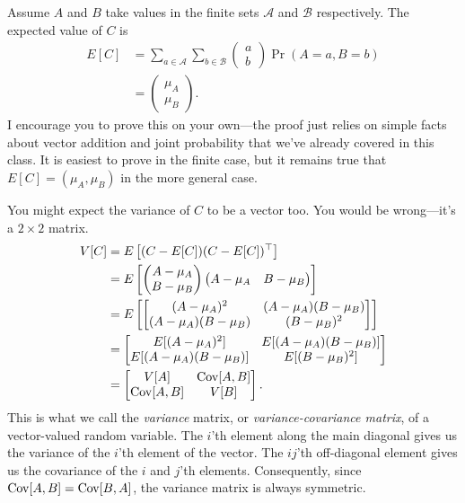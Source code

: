 \documentclass[12pt,oneside,openany]{book}
\begin{document}
Assume \(A\) and \(B\) take values in the finite sets \(\mathcal{A}\)
and \(\mathcal{B}\) respectively. The expected value of \(C\) is \[
\begin{aligned}
E[C]
&= \sum_{a \in \mathcal{A}} \sum_{b \in \mathcal{B}} \begin{pmatrix} a \\ b \end{pmatrix} \Pr(A = a, B = b) \\
&= \begin{pmatrix} \mu_A \\ \mu_B \end{pmatrix}.
\end{aligned}
\] I encourage you to prove this on your own---the proof just relies on
simple facts about vector addition and joint probability that we've
already covered in this class. It is easiest to prove in the finite
case, but it remains true that \(E[C] = (\mu_A, \mu_B)\) in the more
general case.

You might expect the variance of \(C\) to be a vector too. You would be
wrong---it's a \(2 \times 2\) matrix. \[
\begin{aligned}
V[C]
&= E\left[(C - E[C]) (C - E[C])^\top \right] \\
&= E \left[
  \begin{pmatrix} A - \mu_A \\ B - \mu_B \end{pmatrix}
  \begin{pmatrix} A - \mu_A & B - \mu_B \end{pmatrix}
\right] \\
&= E \left[
  \begin{bmatrix}
  (A - \mu_A)^2 & (A - \mu_A) (B - \mu_B) \\
  (A - \mu_A) (B - \mu_B) & (B - \mu_B)^2
  \end{bmatrix}
\right] \\
&= \begin{bmatrix}
  E[(A - \mu_A)^2] & E[(A - \mu_A) (B - \mu_B)] \\
  E[(A - \mu_A) (B - \mu_B)] & E[(B - \mu_B)^2]
\end{bmatrix} \\
&= \begin{bmatrix}
  V[A] & \mathop{\rm Cov}\nolimits[A, B] \\
  \mathop{\rm Cov}\nolimits[A, B] & V[B]
\end{bmatrix}.
\end{aligned}
\] This is what we call the \emph{variance} matrix, or
\emph{variance-covariance matrix}, of a vector-valued random variable.
The \(i\)'th element along the main diagonal gives us the variance of
the \(i\)'th element of the vector. The \(ij\)'th off-diagonal element
gives us the covariance of the \(i\) and \(j\)'th elements.
Consequently, since \(\mathop{\rm Cov}\nolimits[A, B] = \mathop{\rm Cov}\nolimits[B, A]\), the variance matrix is
always symmetric.
\end{document}
